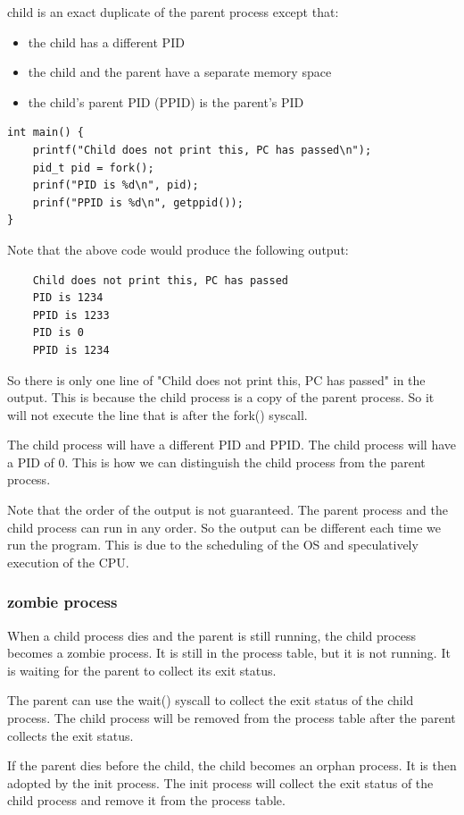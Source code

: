 \documentclass[letterpaper,12pt]{article}
\begin{document}
child is an exact duplicate of the parent process except that:\begin{itemize}
    \item the child has a different PID
    \item the child and the parent have a separate memory space
    \item the child's parent PID (PPID) is the parent's PID
\end{itemize}

\begin{lstlisting}
int main() {
    printf("Child does not print this, PC has passed\n");
    pid_t pid = fork();
    prinf("PID is %d\n", pid);
    prinf("PPID is %d\n", getppid());
}
\end{lstlisting}
Note that the above code would produce the following output:\begin{lstlisting}
    Child does not print this, PC has passed
    PID is 1234
    PPID is 1233
    PID is 0
    PPID is 1234
\end{lstlisting}
So there is only one line of "Child does not print this, PC has passed" in the
output. This is because the child process is a copy of the parent process. So
it will not execute the line that is after the fork() syscall.

The child process will have a different PID and PPID. The child process will
have a PID of 0. This is how we can distinguish the child process from the
parent process.

Note that the order of the output is not guaranteed. The parent process and the
child process can run in any order. So the output can be different each time we
run the program. This is due to the scheduling of the OS and speculatively
execution of the CPU.

\subsubsection{zombie process}
When a child process dies and the parent is still running, the child process
becomes a zombie process. It is still in the process table, but it is not
running. It is waiting for the parent to collect its exit status.

The parent can use the wait() syscall to collect the exit status of the child
process. The child process will be removed from the process table after the
parent collects the exit status.

If the parent dies before the child, the child becomes an orphan process. It is
then adopted by the init process. The init process will collect the exit status
of the child process and remove it from the process table.
\end{document}
